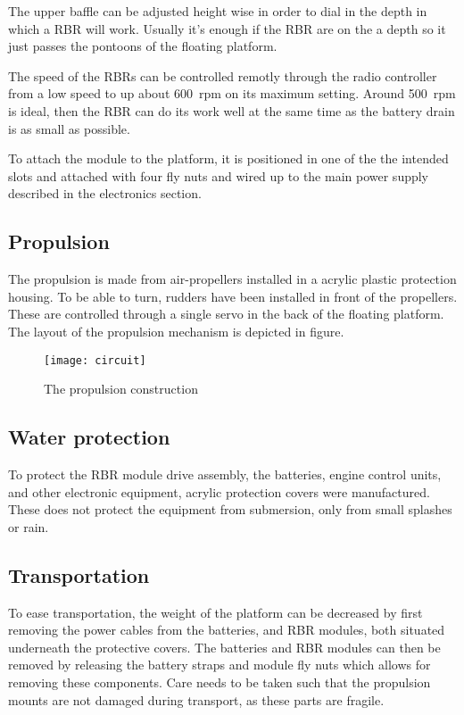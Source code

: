 The upper baffle can be adjusted height wise in order to dial in the
depth in which a RBR will work. Usually it's enough if the RBR are on the a
depth so it just passes the pontoons of the floating platform.

The speed of the RBRs can be controlled remotly through the radio controller
from a low speed to up about 600~rpm on its maximum setting. Around 500~rpm is
ideal, then the RBR can do its work well at the same time as the battery drain
is as small as possible.

To attach the module to the platform, it is positioned in one of the the
intended slots and attached with four fly nuts and wired up to the main power
supply described in the electronics section.

\subsection{Propulsion}
The propulsion is made from air-propellers installed in a acrylic plastic
protection housing. To be able to turn, rudders have been installed in
front of the propellers. These are controlled through a single servo in the back
of the floating platform. The layout of the propulsion mechanism is depicted in
figure.

\begin{figure}[h]
   \centering
   \texttt{[image: circuit]}
   \caption{The propulsion construction}
   \label{fig:circuit}
\end{figure}

\subsection{Water protection}
To protect the RBR module drive assembly, the batteries, engine control units,
and other electronic equipment, acrylic protection covers were manufactured.
These does not protect the equipment from submersion, only from small splashes
or rain.

\subsection{Transportation}
To ease transportation, the weight of the platform can be decreased by first
removing the power cables from the batteries, and RBR modules, both situated
underneath the protective covers. The batteries and RBR modules can then be
removed by releasing the battery straps and module fly nuts which allows for
removing these components. Care needs to be taken such that the propulsion
mounts are not damaged during transport, as these parts are fragile.
